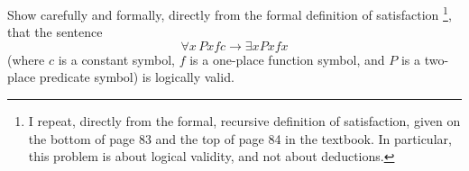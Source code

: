 \begin{problem}
  Show carefully and formally, directly from the formal definition of satisfaction
  \footnote{
    I repeat, directly from the formal, recursive definition of satisfaction,
    given on the bottom of page 83 and the top of page 84 in the textbook.
    In particular, this problem  is about logical validity, and not about deductions.
  },
  that the sentence $$ \forall x\,  Pxfc \rightarrow \exists x Pxfx$$
  (where $c$ is a constant symbol, $f$ is a one-place function symbol,
  and $P$ is a two-place predicate symbol) is logically valid.
\end{problem}
\begin{Answer}

\end{Answer}
